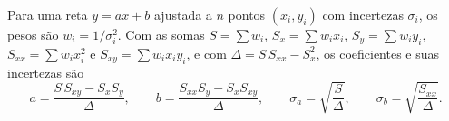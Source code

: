 \documentclass[12pt,a4paper]{report}
\begin{document}
Para uma reta $y = a x + b$ ajustada a $n$ pontos $(x_i, y_i)$ com incertezas $\sigma_i$, os pesos são $w_i = 1/\sigma_i^2$. Com as somas $S = \sum w_i$, $S_x = \sum w_i x_i$, $S_y = \sum w_i y_i$, $S_{xx} = \sum w_i x_i^2$ e $S_{xy} = \sum w_i x_i y_i$, e com $\Delta = S\,S_{xx} - S_x^2$, os coeficientes e suas incertezas são \cite{taylor1997}
\begin{equation}
  a = \frac{S\,S_{xy} - S_x S_y}{\Delta}, \qquad
  b = \frac{S_{xx} S_y - S_x S_{xy}}{\Delta}, \qquad
  \sigma_a = \sqrt{\frac{S}{\Delta}}, \qquad
  \sigma_b = \sqrt{\frac{S_{xx}}{\Delta}}.
\end{equation}
\end{document}
